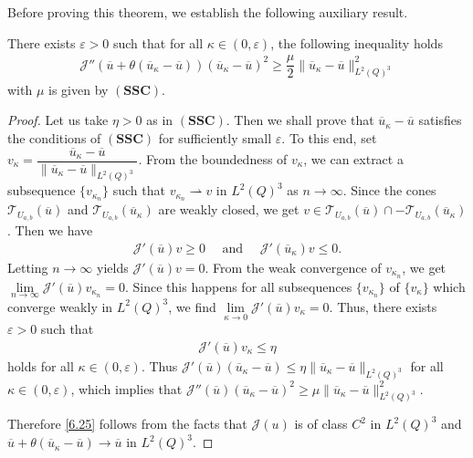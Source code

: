 \documentclass[reqno]{amsart}
\begin{document}
	Before proving this theorem, we establish the following auxiliary result. 
	
	
	\begin{lemma}\label{lem6.3}
		There exists $\varepsilon >0$ such that for all $\kappa \in (0,\varepsilon)$, the following inequality holds
		\begin{align}\label{6.25}
			\mathcal{J}''(\overline{u} + \theta (\overline{u}_\kappa - \overline{u} ))( \overline{u}_\kappa - \overline{u})^2 \geq \dfrac{\mu}{2}\| \overline{u}_\kappa - \overline{u} \|^2_{L^2(Q)^3}
		\end{align}
		with $\mu$ is given by $(\textbf{SSC})$. 
	\end{lemma}
	
	\begin{proof}
		Let us take $\eta >0$ as in $(\textbf{SSC})$. Then we shall prove that $\overline{u}_\kappa - \overline{u}$ satisfies the conditions of $(\textbf{SSC})$ for sufficiently small $\varepsilon$. To this end, set $v_\kappa = \dfrac{\overline{u}_\kappa - \overline{u}}{\| \overline{u}_\kappa - \overline{u}\|_{L^2(Q)^3}}$. From the boundedness of $v_\kappa$, we can extract a subsequence $\{v_{\kappa_n}\}$ such that $v_{\kappa_n} \rightharpoonup v$ in $L^2(Q)^3$ as $n \to \infty$.  Since the cones $\mathcal{T}_{U_{a,b}} (\overline{u})$ and $\mathcal{T}_{U_{a,b}}(\overline{u}_\kappa)$ are weakly closed, we get $v \in \mathcal{T}_{U_{a,b}} (\overline{u}) \cap - \mathcal{T}_{U_{a,b}}(\overline{u}_\kappa)$. Then we have
		\begin{align*}
			\mathcal{J}'(\overline{u})v \geq 0 \quad \text{ and } \quad \mathcal{J}'(\overline{u}_\kappa)v \leq 0.
		\end{align*}
		Letting $n \to \infty$ yields $\mathcal{J}'(\overline{u})v=0$. From the weak convergence of $v_{\kappa_n}$, we get $\underset{n\rightarrow\infty}{\lim} \mathcal{J}'(\overline{u})v_{\kappa_n} = 0$. Since this happens for all subsequences $\{v_{\kappa_n}\}$ of $\{v_\kappa\}$ which converge weakly in $L^2(Q)^3$, we find $\underset{\kappa \to 0}{\lim} \mathcal{J}'(\overline{u})v_{\kappa} = 0$. Thus, there exists $\varepsilon>0$ such that 
		\begin{align*}
			\mathcal{J}'(\overline{u})v_{\kappa} \leq \eta
		\end{align*}
		holds for all $\kappa \in (0,\varepsilon)$. Thus $\mathcal{J}'(\overline{u})(\overline{u}_\kappa- \overline{u}) \leq \eta \| \overline{u}_\kappa - \overline{u}\|_{L^2(Q)^3}$ for all $\kappa \in (0,\varepsilon)$, which implies that $\mathcal{J}''(\overline{u})(\overline{u}_\kappa - \overline{u})^2 \geq \mu \| \overline{u}_\kappa - \overline{u} \|^2_{L^2(Q)^3}$.
		
		Therefore \eqref{6.25} follows from the facts that $\mathcal{J}(u)$ is of class $C^2$ in $L^2(Q)^3$ and $\overline{u} + \theta (\overline{u}_\kappa - \overline{u}) \to \overline{u}$ in $L^2(Q)^3$. 
	\end{proof}
\end{document}
